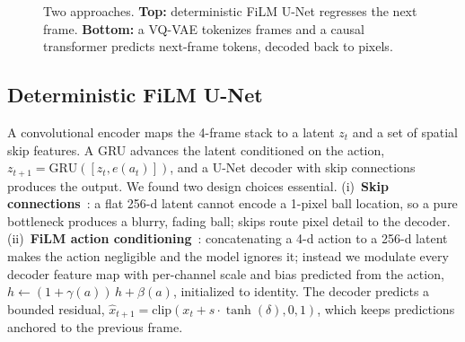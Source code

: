 \documentclass[10pt,twocolumn,letterpaper]{article}
\begin{document}
\begin{figure}[t]
\centering
{}
\caption{Two approaches. \textbf{Top:} deterministic FiLM U-Net regresses the
next frame. \textbf{Bottom:} a VQ-VAE tokenizes frames and a causal transformer
predicts next-frame tokens, decoded back to pixels.}
\label{fig:arch}
\end{figure}

\subsection{Deterministic FiLM U-Net}
A convolutional encoder maps the 4-frame stack to a latent $z_t$ and a set of
spatial skip features. A GRU advances the latent conditioned on the action,
$z_{t+1}=\mathrm{GRU}([z_t, e(a_t)])$, and a U-Net decoder with skip connections
produces the output. We found two design choices essential. (i)~\textbf{Skip
connections}~\cite{ronneberger2015unet}: a flat 256-d latent cannot encode a
1-pixel ball location, so a pure bottleneck produces a blurry, fading ball; skips
route pixel detail to the decoder. (ii)~\textbf{FiLM action conditioning}~\cite{perez2018film}:
concatenating a 4-d action to a 256-d latent makes the action negligible and the
model ignores it; instead we modulate every decoder feature map with per-channel
scale and bias predicted from the action, $h \!\leftarrow\! (1+\gamma(a))\,h +
\beta(a)$, initialized to identity. The decoder predicts a bounded residual,
$\hat{x}_{t+1}=\mathrm{clip}(x_t + s\cdot\tanh(\delta),0,1)$, which keeps
predictions anchored to the previous frame.
\end{document}
